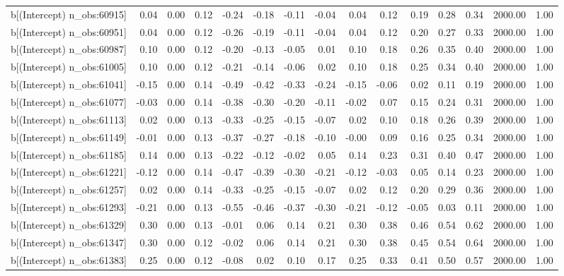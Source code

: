 \begin{table}[ht]
\begin{tabular}{rrrrrrrrrrrrrrr}
  b[(Intercept) n\_obs:60915] & 0.04 & 0.00 & 0.12 & -0.24 & -0.18 & -0.11 & -0.04 & 0.04 & 0.12 & 0.19 & 0.28 & 0.34 & 2000.00 & 1.00 \\ 
  b[(Intercept) n\_obs:60951] & 0.04 & 0.00 & 0.12 & -0.26 & -0.19 & -0.11 & -0.04 & 0.04 & 0.12 & 0.20 & 0.27 & 0.33 & 2000.00 & 1.00 \\ 
  b[(Intercept) n\_obs:60987] & 0.10 & 0.00 & 0.12 & -0.20 & -0.13 & -0.05 & 0.01 & 0.10 & 0.18 & 0.26 & 0.35 & 0.40 & 2000.00 & 1.00 \\ 
  b[(Intercept) n\_obs:61005] & 0.10 & 0.00 & 0.12 & -0.21 & -0.14 & -0.06 & 0.02 & 0.10 & 0.18 & 0.25 & 0.34 & 0.40 & 2000.00 & 1.00 \\ 
  b[(Intercept) n\_obs:61041] & -0.15 & 0.00 & 0.14 & -0.49 & -0.42 & -0.33 & -0.24 & -0.15 & -0.06 & 0.02 & 0.11 & 0.19 & 2000.00 & 1.00 \\ 
  b[(Intercept) n\_obs:61077] & -0.03 & 0.00 & 0.14 & -0.38 & -0.30 & -0.20 & -0.11 & -0.02 & 0.07 & 0.15 & 0.24 & 0.31 & 2000.00 & 1.00 \\ 
  b[(Intercept) n\_obs:61113] & 0.02 & 0.00 & 0.13 & -0.33 & -0.25 & -0.15 & -0.07 & 0.02 & 0.10 & 0.18 & 0.26 & 0.39 & 2000.00 & 1.00 \\ 
  b[(Intercept) n\_obs:61149] & -0.01 & 0.00 & 0.13 & -0.37 & -0.27 & -0.18 & -0.10 & -0.00 & 0.09 & 0.16 & 0.25 & 0.34 & 2000.00 & 1.00 \\ 
  b[(Intercept) n\_obs:61185] & 0.14 & 0.00 & 0.13 & -0.22 & -0.12 & -0.02 & 0.05 & 0.14 & 0.23 & 0.31 & 0.40 & 0.47 & 2000.00 & 1.00 \\ 
  b[(Intercept) n\_obs:61221] & -0.12 & 0.00 & 0.14 & -0.47 & -0.39 & -0.30 & -0.21 & -0.12 & -0.03 & 0.05 & 0.14 & 0.23 & 2000.00 & 1.00 \\ 
  b[(Intercept) n\_obs:61257] & 0.02 & 0.00 & 0.14 & -0.33 & -0.25 & -0.15 & -0.07 & 0.02 & 0.12 & 0.20 & 0.29 & 0.36 & 2000.00 & 1.00 \\ 
  b[(Intercept) n\_obs:61293] & -0.21 & 0.00 & 0.13 & -0.55 & -0.46 & -0.37 & -0.30 & -0.21 & -0.12 & -0.05 & 0.03 & 0.11 & 2000.00 & 1.00 \\ 
  b[(Intercept) n\_obs:61329] & 0.30 & 0.00 & 0.13 & -0.01 & 0.06 & 0.14 & 0.21 & 0.30 & 0.38 & 0.46 & 0.54 & 0.62 & 2000.00 & 1.00 \\ 
  b[(Intercept) n\_obs:61347] & 0.30 & 0.00 & 0.12 & -0.02 & 0.06 & 0.14 & 0.21 & 0.30 & 0.38 & 0.45 & 0.54 & 0.64 & 2000.00 & 1.00 \\ 
  b[(Intercept) n\_obs:61383] & 0.25 & 0.00 & 0.12 & -0.08 & 0.02 & 0.10 & 0.17 & 0.25 & 0.33 & 0.41 & 0.50 & 0.57 & 2000.00 & 1.00 \\ 

\end{tabular}
\end{table}
